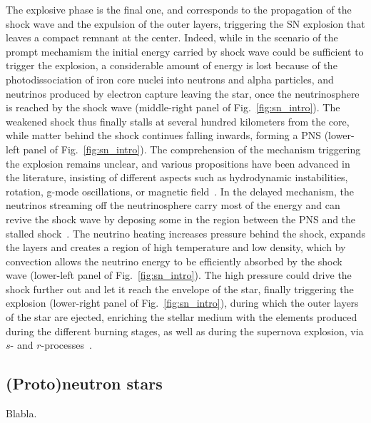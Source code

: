The explosive phase is the final one, and corresponds to the propagation of
the shock wave and the expulsion of the outer layers, triggering the SN 
explosion that leaves a compact remnant at the center.  
Indeed, while in the scenario of the prompt mechamism the initial energy 
carried by shock wave could be sufficient to trigger the explosion, a 
considerable amount of energy is lost because of the photodissociation of iron 
core nuclei into neutrons and alpha particles, and neutrinos produced by 
electron capture leaving the star, once the neutrinosphere is reached by the 
shock wave (middle-right panel of Fig.~\ref{fig:sn_intro}). 
The weakened shock thus finally stalls at several hundred 
kilometers from the core, while matter behind the shock continues falling 
inwards, forming a PNS (lower-left panel of Fig.~\ref{fig:sn_intro}).
The comprehension of the mechanism triggering the explosion remains unclear,
and various propositions have been advanced in the literature, insisting of
different aspects such as hydrodynamic instabilities, rotation, g-mode 
oscillations, or magnetic field~\cite{Janka2007}.
%
In the delayed mechanism, the neutrinos streaming off the neutrinosphere carry 
most of the energy and can revive the shock wave by deposing some in the region
between the PNS and the stalled shock~\cite{Janka2007}.
The neutrino heating increases pressure behind the shock, expands the layers 
and creates a region of high temperature and low density, which by convection
allows the neutrino energy to be efficiently absorbed by the shock wave
(lower-left panel of Fig.~\ref{fig:sn_intro}). The high pressure 
could drive the shock further out and let it reach the envelope of the star, 
finally triggering the explosion (lower-right panel of 
Fig.~\ref{fig:sn_intro}), during which the outer layers of the star are 
ejected, enriching the stellar medium with the elements produced during the 
different burning stages, as well as during the supernova explosion, via $s$- 
and $r$-processes~\cite{Woosley2002,Janka2007}.

\subsection*{(Proto)neutron stars}

Blabla.


